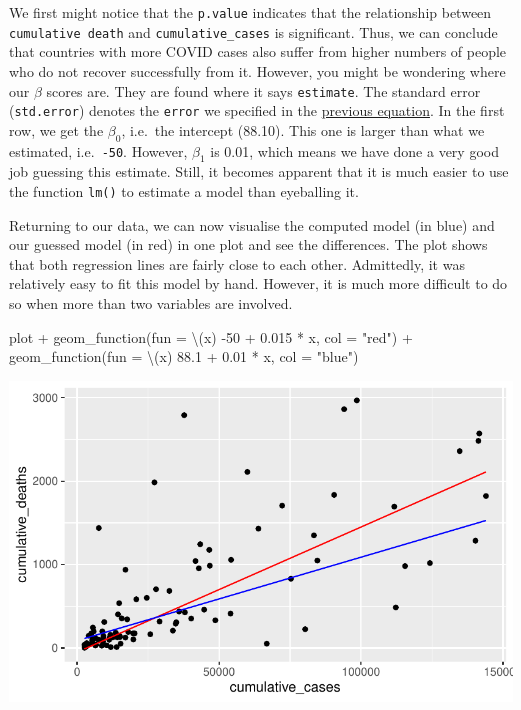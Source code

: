 \documentclass[
  letterpaper,
]{krantz}
\makeatletter
\newenvironment{Shaded}{\begin{snugshade}}{\end{snugshade}}
\newcommand{\AttributeTok}[1]{\textcolor[rgb]{0.40,0.45,0.13}{#1}}
\newcommand{\DecValTok}[1]{\textcolor[rgb]{0.68,0.00,0.00}{#1}}
\newcommand{\FloatTok}[1]{\textcolor[rgb]{0.68,0.00,0.00}{#1}}
\newcommand{\FunctionTok}[1]{\textcolor[rgb]{0.28,0.35,0.67}{#1}}
\newcommand{\NormalTok}[1]{\textcolor[rgb]{0.00,0.23,0.31}{#1}}
\newcommand{\SpecialCharTok}[1]{\textcolor[rgb]{0.37,0.37,0.37}{#1}}
\newcommand{\StringTok}[1]{\textcolor[rgb]{0.13,0.47,0.30}{#1}}
\newenvironment{kframe}{%
\medskip{}
\setlength{\fboxsep}{.8em}
 \def\at@end@of@kframe{}%
 \ifinner\ifhmode%
  \def\at@end@of@kframe{\end{minipage}}%
  \begin{minipage}{\columnwidth}%
 \fi\fi%
 \def\FrameCommand##1{\hskip\@totalleftmargin \hskip-\fboxsep
 \colorbox{shadecolor}{##1}\hskip-\fboxsep
     \hskip-\linewidth \hskip-\@totalleftmargin \hskip\columnwidth}%
 \MakeFramed {\advance\hsize-\width
   \@totalleftmargin\z@ \linewidth\hsize
   \@setminipage}}%
 {\par\unskip\endMakeFramed%
 \at@end@of@kframe}
\renewenvironment{Shaded}{\begin{kframe}}{\end{kframe}}
\makeatother
\begin{document}
We first might notice that the \texttt{p.value} indicates that the
relationship between \texttt{cumulative\ death} and
\texttt{cumulative\_cases} is significant. Thus, we can conclude that
countries with more COVID cases also suffer from higher numbers of
people who do not recover successfully from it. However, you might be
wondering where our \(\beta\) scores are. They are found where it says
\texttt{estimate}. The standard error (\texttt{std.error}) denotes the
\texttt{error} we specified in the
\hyperref[single-linear-regression]{previous equation}. In the first
row, we get the \(\beta_0\), i.e.~the intercept (88.10). This one is
larger than what we estimated, i.e.~\texttt{-50}. However, \(\beta_1\)
is 0.01, which means we have done a very good job guessing this
estimate. Still, it becomes apparent that it is much easier to use the
function \texttt{lm()} to estimate a model than eyeballing it.

Returning to our data, we can now visualise the computed model (in blue)
and our guessed model (in red) in one plot and see the differences. The
plot shows that both regression lines are fairly close to each other.
Admittedly, it was relatively easy to fit this model by hand. However,
it is much more difficult to do so when more than two variables are
involved.

\begin{Shaded}
\begin{Highlighting}[]
\NormalTok{plot }\SpecialCharTok{+}
  \FunctionTok{geom\_function}\NormalTok{(}\AttributeTok{fun =}\NormalTok{ \textbackslash{}(x) }\SpecialCharTok{{-}}\DecValTok{50} \SpecialCharTok{+} \FloatTok{0.015} \SpecialCharTok{*}\NormalTok{ x, }\AttributeTok{col =} \StringTok{"red"}\NormalTok{) }\SpecialCharTok{+}
    \FunctionTok{geom\_function}\NormalTok{(}\AttributeTok{fun =}\NormalTok{ \textbackslash{}(x) }\FloatTok{88.1} \SpecialCharTok{+} \FloatTok{0.01} \SpecialCharTok{*}\NormalTok{ x, }\AttributeTok{col =} \StringTok{"blue"}\NormalTok{)}
\end{Highlighting}
\end{Shaded}

\includegraphics{13_regressions_files/figure-latex/comparing-computed-vs-hand-fitted-1.pdf}
\end{document}
